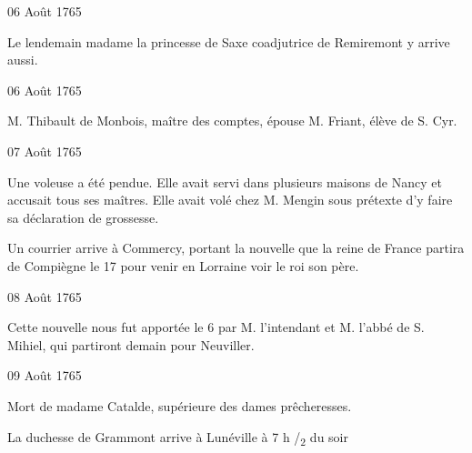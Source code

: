                      \begin{diary}{06 Août 1765}{}

                         Le lendemain madame la princesse de Saxe
                           coadjutrice de Remiremont y arrive aussi. \bigskip


                     \end{diary}

                     \begin{diary}{06 Août 1765}{}


                           M. Thibault de Monbois, maître des comptes,
                           épouse M. Friant, élève de S. Cyr. \bigskip


                     \end{diary}

                     \begin{diary}{07 Août 1765}{}

                         Une voleuse a été pendue. Elle
                           avait servi
                           dans plusieurs maisons de Nancy
                           et accusait
                           tous ses maîtres. Elle avait volé chez
                           M. Mengin
                           sous prétexte d'y faire sa déclaration de grossesse. \bigskip


                         Un courrier arrive à Commercy, portant
                           la nouvelle que la reine
                              de France partira
                           de Compiègne
                           le 17 pour venir en Lorraine
                           voir le roi son père.
                        \bigskip


                     \end{diary}

                     \begin{diary}{08 Août 1765}{}

                         Cette nouvelle nous fut apportée le 6
                           par M. l'intendant et
                              M. l'abbé de S.
                              Mihiel, qui partiront demain pour Neuviller. \bigskip


                     \end{diary}

                     \begin{diary}{09 Août 1765}{}

                         Mort de madame Catalde, supérieure des
                           dames prêcheresses. \bigskip



                           La duchesse de Grammont
                           arrive à Lunéville
                           à 7 h /\textsubscript{2} du soir \bigskip


                     \end{diary}

